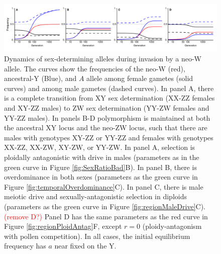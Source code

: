 \documentclass[12pt]{article}
\begin{document}
\begin{landscape}
\begin{figure}[!h]
\centering
\centerline{
\includegraphics[width=\linewidth]{Freq_plot_combined_PloidAntag_Matt}
}
\caption{
Dynamics of sex-determining alleles during invasion by a neo-W allele. 
The curves show the frequencies of the neo-W (red), ancestral-Y (Blue), and $A$ allele among female gametes (solid curves) and among male gametes (dashed curves). 
In panel A, there is a complete transition from XY sex determination (XX-ZZ females and XY-ZZ males) to ZW sex determination (YY-ZW females and YY-ZZ males).  
In panels B-D polymorphism is maintained at both the ancestral XY locus and the neo-ZW locus, such that there are males with genotypes XY-ZZ or YY-ZZ and females with genotypes XX-ZZ, XX-ZW, XY-ZW, or YY-ZW. 
In panel A, selection is ploidally antagonistic with drive in males (parameters as in the green curve in Figure \ref{fig:SexRatioBad}B).
In panel B, there is overdominance in both sexes (parameters as the green curve in Figure \ref{fig:temporalOverdominance}C).
In panel C, there is male meiotic drive and sexually-antagonistic selection in diploids (parameters as the green curve in Figure \ref{fig:regionMaleDrive}C).
\textcolor{red}{(remove D?)}
Panel D has the same parameters as the red curve in Figure \ref{fig:regionPloidAntag}F, except $r=0$ (ploidy-antagonism with pollen competition).
In all cases, the initial equilibrium frequency has $a$ near fixed on the Y.
}
\label{fig:freqAll}
\end{figure}
\end{landscape}


\end{document}
